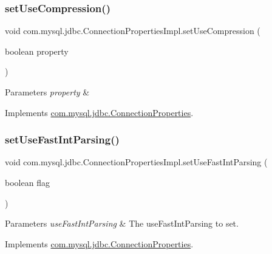 \subsubsection{\texorpdfstring{set\+Use\+Compression()}{setUseCompression()}}
{\footnotesize\ttfamily void com.\+mysql.\+jdbc.\+Connection\+Properties\+Impl.\+set\+Use\+Compression (\begin{DoxyParamCaption}\item[{boolean}]{property }\end{DoxyParamCaption})}


\begin{DoxyParams}{Parameters}
{\em property} & \\
\hline
\end{DoxyParams}


Implements \mbox{\hyperlink{interfacecom_1_1mysql_1_1jdbc_1_1_connection_properties_a60f864890c4947c6a45fb0d99cc7c78d}{com.\+mysql.\+jdbc.\+Connection\+Properties}}.

\mbox{\label{classcom_1_1mysql_1_1jdbc_1_1_connection_properties_impl_ae1ca2a8981c38d1a0a31a25507299f1f}} 
\subsubsection{\texorpdfstring{set\+Use\+Fast\+Int\+Parsing()}{setUseFastIntParsing()}}
{\footnotesize\ttfamily void com.\+mysql.\+jdbc.\+Connection\+Properties\+Impl.\+set\+Use\+Fast\+Int\+Parsing (\begin{DoxyParamCaption}\item[{boolean}]{flag }\end{DoxyParamCaption})}


\begin{DoxyParams}{Parameters}
{\em use\+Fast\+Int\+Parsing} & The use\+Fast\+Int\+Parsing to set. \\
\hline
\end{DoxyParams}


Implements \mbox{\hyperlink{interfacecom_1_1mysql_1_1jdbc_1_1_connection_properties_a64d13f1fe9290e34ad189fd0eb13b81d}{com.\+mysql.\+jdbc.\+Connection\+Properties}}.

